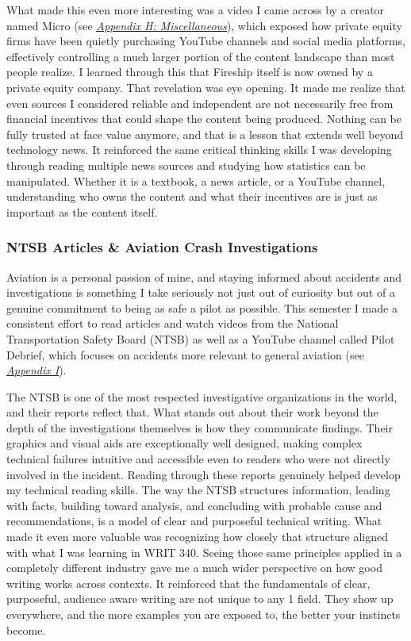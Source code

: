 \documentclass[12pt]{article}
\let\oldhyperref\hyperref
\renewcommand{\hyperref}[2][]{\oldhyperref[#1]{\textit{\uline{#2}}}}
\begin{document}
            What made this even more interesting was a video I came across by a creator named Micro (see \hyperref[appendix:h:misc]{Appendix H: Miscellaneous}), which exposed how private equity firms have been quietly purchasing YouTube channels and social media platforms, effectively controlling a much larger portion of the content landscape than most people realize. I learned through this that Fireship itself is now owned by a private equity company. That revelation was eye opening. It made me realize that even sources I considered reliable and independent are not necessarily free from financial incentives that could shape the content being produced. Nothing can be fully trusted at face value anymore, and that is a lesson that extends well beyond technology news. It reinforced the same critical thinking skills I was developing through reading multiple news sources and studying how statistics can be manipulated. Whether it is a textbook, a news article, or a YouTube channel, understanding who owns the content and what their incentives are is just as important as the content itself.

            \subsubsection{NTSB Articles \& Aviation Crash Investigations}
            \label{sec:ntsb}

            Aviation is a personal passion of mine, and staying informed about accidents and investigations is something I take seriously not just out of curiosity but out of a genuine commitment to being as safe a pilot as possible. This semester I made a consistent effort to read articles and watch videos from the National Transportation Safety Board (NTSB) as well as a YouTube channel called Pilot Debrief, which focuses on accidents more relevant to general aviation (see \hyperref[appendix:i]{Appendix I}).

            The NTSB is one of the most respected investigative organizations in the world, and their reports reflect that. What stands out about their work beyond the depth of the investigations themselves is how they communicate findings. Their graphics and visual aids are exceptionally well designed, making complex technical failures intuitive and accessible even to readers who were not directly involved in the incident. Reading through these reports genuinely helped develop my technical reading skills. The way the NTSB structures information, leading with facts, building toward analysis, and concluding with probable cause and recommendations, is a model of clear and purposeful technical writing. What made it even more valuable was recognizing how closely that structure aligned with what I was learning in WRIT 340. Seeing those same principles applied in a completely different industry gave me a much wider perspective on how good writing works across contexts. It reinforced that the fundamentals of clear, purposeful, audience aware writing are not unique to any 1 field. They show up everywhere, and the more examples you are exposed to, the better your instincts become.
\end{document}
